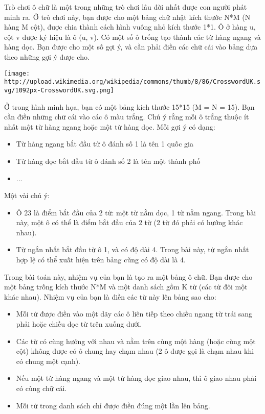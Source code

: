 Trò chơi ô chữ là một trong những trò chơi lâu đời nhất được con người phát minh ra. Ở trò chơi này, bạn được cho một bảng chữ nhật kích thước N*M (N hàng M cột), được chia thành cách hình vuông nhỏ kích thước 1*1. Ô ở hàng u, cột v được ký hiệu là ô (u, v). Có một số ô trống tạo thành các từ hàng ngang và hàng dọc. Bạn được cho một số gợi ý, và cần phải điền các chữ cái vào bảng dựa theo những gợi ý được cho.


\texttt{[image: http://upload.wikimedia.org/wikipedia/commons/thumb/8/86/CrosswordUK.svg/1092px-CrosswordUK.svg.png]}

Ở trong hình minh họa, bạn có một bảng kích thước 15*15 (M = N = 15). Bạn cần điền những chữ cái vào các ô màu trắng. Chú ý rằng mỗi ô trắng thuộc ít nhất một từ hàng ngang hoặc một từ hàng dọc. Mỗi gợi ý có dạng:
\begin{itemize}
	\item Từ hàng ngang bắt đầu từ ô đánh số 1 là tên 1 quốc gia
	\item Từ hàng dọc bắt đầu từ ô đánh số 2 là tên một thành phố
	\item ...
\end{itemize}

Một vài chú ý:
\begin{itemize}
	\item Ô 23 là điểm bắt đầu của 2 từ: một từ nằm dọc, 1 từ nằm ngang. Trong bài này, một ô có thể là điểm bắt đầu của 2 từ (2 từ đó phải có hướng khác nhau).
	\item Từ ngắn nhất bắt đầu từ ô 1, và có độ dài 4. Trong bài này, từ ngắn nhất hợp lệ có thể xuất hiện trên bảng cũng có độ dài là 4.
\end{itemize}

Trong bài toán này, nhiệm vụ của bạn là tạo ra một bảng ô chữ. Bạn được cho một bảng trống kích thước N*M và một danh sách gồm K từ (các từ đôi một khác nhau). Nhiệm vụ của bạn là điền các từ này lên bảng sao cho:
\begin{itemize}
	\item Mỗi từ được điền vào một dãy các ô liên tiếp theo chiều ngang từ trái sang phải hoặc chiều dọc từ trên xuống dưới.
	\item Các từ có cùng hướng với nhau và nằm trên cùng một hàng (hoặc cùng một cột) không được có ô chung hay chạm nhau (2 ô được gọi là chạm nhau khi có chung một cạnh).
	\item Nếu một từ hàng ngang và một từ hàng dọc giao nhau, thì ô giao nhau phải có cùng chữ cái.
	\item Mỗi từ trong danh sách chỉ được điền đúng một lần lên bảng.
\end{itemize}